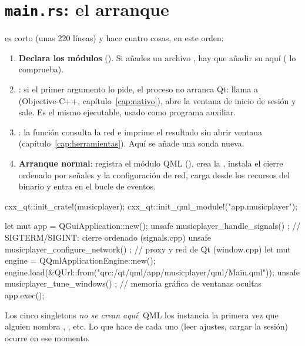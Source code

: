 \section{\texttt{main.rs}: el arranque}

 es corto (unas 220 líneas) y hace cuatro cosas, en este orden:

\begin{enumerate}
  \item \textbf{Declara los módulos} (). Si añades un archivo
  , hay que añadir su  aquí ( lo comprueba).
  \item \textbf{}: si el primer argumento lo pide, el proceso no arranca
  Qt: llama a  (Objective-C++, capítulo~\ref{cap:nativo}), abre la
  ventana de inicio de sesión y sale. Es el mismo ejecutable, usado como programa auxiliar.
  \item \textbf{}: la función  consulta la red e imprime el resultado sin
  abrir ventana (capítulo~\ref{cap:herramientas}). Aquí se añade una sonda nueva.
  \item \textbf{Arranque normal}: registra el módulo QML (), crea la
  , instala el cierre ordenado por señales y la configuración de red, carga
   desde los recursos del binario y entra en el bucle de eventos.
\end{enumerate}

\begin{rust}
cxx_qt::init_crate!(musicplayer);
cxx_qt::init_qml_module!("app.musicplayer");

let mut app = QGuiApplication::new();
unsafe { musicplayer_handle_signals() };     // SIGTERM/SIGINT: cierre ordenado (signals.cpp)
unsafe { musicplayer_configure_network() };  // proxy y red de Qt (window.cpp)
let mut engine = QQmlApplicationEngine::new();
engine.load(&QUrl::from("qrc:/qt/qml/app/musicplayer/qml/Main.qml"));
unsafe { musicplayer_tune_windows() };       // memoria gráfica de ventanas ocultas
app.exec();
\end{rust}

Los cinco singletons \emph{no se crean aquí}: QML los instancia la primera vez que alguien
nombra , , etc. Lo que hace  de cada uno
(leer ajustes, cargar la sesión) ocurre en ese momento.

